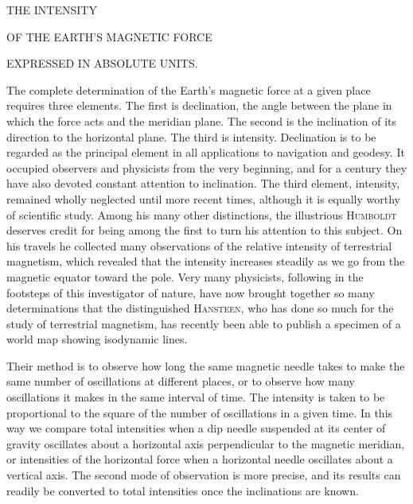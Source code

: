 \renewcommand{\Article}[1]{\par\medskip\Needspace{4\baselineskip}\pdfbookmark[1]{Art. #1}{magnetism-art-#1}\centerline{\textbf{#1.}}\nobreak\smallskip}
\par\medskip
\centerline{THE INTENSITY}
\centerline{OF THE EARTH'S MAGNETIC FORCE}
\centerline{EXPRESSED IN ABSOLUTE UNITS.}
\medskip
The complete determination of the Earth's magnetic force at a given place requires three elements. The first is declination, the angle between the plane in which the force acts and the meridian plane. The second is the inclination of its direction to the horizontal plane. The third is intensity. Declination is to be regarded as the principal element in all applications to navigation and geodesy. It occupied observers and physicists from the very beginning, and for a century they have also devoted constant attention to inclination. The third element, intensity, remained wholly neglected until more recent times, although it is equally worthy of scientific study. Among his many other distinctions, the illustrious \textsc{Humboldt} deserves credit for being among the first to turn his attention to this subject. On his travels he collected many observations of the relative intensity of terrestrial magnetism, which revealed that the intensity increases steadily as we go from the magnetic equator toward the pole. Very many physicists, following in the footsteps of this investigator of nature, have now brought together so many determinations that the distinguished \textsc{Hansteen}, who has done so much for the study of terrestrial magnetism, has recently been able to publish a specimen of a world map showing isodynamic lines.

Their method is to observe how long the same magnetic needle takes to make the same number of oscillations at different places, or to observe how many oscillations it makes in the same interval of time. The intensity is taken to be proportional to the square of the number of oscillations in a given time. In this way we compare total intensities when a dip needle suspended at its center of gravity oscillates about a horizontal axis perpendicular to the magnetic meridian, or intensities of the horizontal force when a horizontal needle oscillates about a vertical axis. The second mode of observation is more precise, and its results can readily be converted to total intensities once the inclinations are known.

